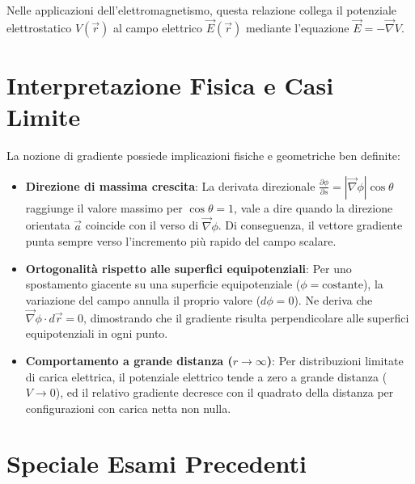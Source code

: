 \documentclass[12pt, a4paper]{article}
\begin{document}
	Nelle applicazioni dell'elettromagnetismo, questa relazione collega il potenziale elettrostatico $V(\vec{r})$ al campo elettrico $\vec{E}(\vec{r})$ mediante l'equazione $\vec{E} = -\vec{\nabla}V$.
	
	\section{Interpretazione Fisica e Casi Limite}
	
	La nozione di gradiente possiede implicazioni fisiche e geometriche ben definite:
	\begin{itemize}
		\item \textbf{Direzione di massima crescita}: La derivata direzionale $\frac{\partial \phi}{\partial s} = |\vec{\nabla}\phi|\cos\theta$ raggiunge il valore massimo per $\cos\theta = 1$, vale a dire quando la direzione orientata $\vec{a}$ coincide con il verso di $\vec{\nabla}\phi$. Di conseguenza, il vettore gradiente punta sempre verso l'incremento più rapido del campo scalare.
		\item \textbf{Ortogonalità rispetto alle superfici equipotenziali}: Per uno spostamento giacente su una superficie equipotenziale ($\phi = \text{costante}$), la variazione del campo annulla il proprio valore ($d\phi = 0$). Ne deriva che $\vec{\nabla}\phi \cdot d\vec{r} = 0$, dimostrando che il gradiente risulta perpendicolare alle superfici equipotenziali in ogni punto.
		\item \textbf{Comportamento a grande distanza ($r \to \infty$)}: Per distribuzioni limitate di carica elettrica, il potenziale elettrico tende a zero a grande distanza ($V \to 0$), ed il relativo gradiente decresce con il quadrato della distanza per configurazioni con carica netta non nulla.
	\end{itemize}
	
	\section{Speciale Esami Precedenti}
	
\end{document}
